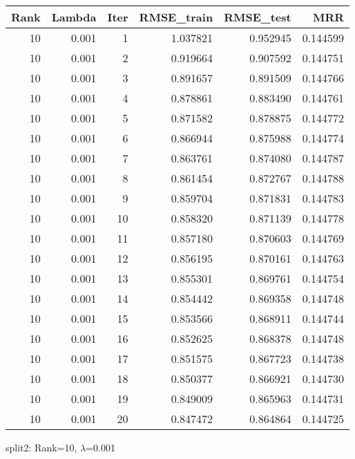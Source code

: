 \begin{tabular}{rrrrrr}
\toprule
 Rank &  Lambda &  Iter &  RMSE\_train &  RMSE\_test &       MRR \\
\midrule
   10 &   0.001 &     1 &    1.037821 &   0.952945 &  0.144599 \\
   10 &   0.001 &     2 &    0.919664 &   0.907592 &  0.144751 \\
   10 &   0.001 &     3 &    0.891657 &   0.891509 &  0.144766 \\
   10 &   0.001 &     4 &    0.878861 &   0.883490 &  0.144761 \\
   10 &   0.001 &     5 &    0.871582 &   0.878875 &  0.144772 \\
   10 &   0.001 &     6 &    0.866944 &   0.875988 &  0.144774 \\
   10 &   0.001 &     7 &    0.863761 &   0.874080 &  0.144787 \\
   10 &   0.001 &     8 &    0.861454 &   0.872767 &  0.144788 \\
   10 &   0.001 &     9 &    0.859704 &   0.871831 &  0.144783 \\
   10 &   0.001 &    10 &    0.858320 &   0.871139 &  0.144778 \\
   10 &   0.001 &    11 &    0.857180 &   0.870603 &  0.144769 \\
   10 &   0.001 &    12 &    0.856195 &   0.870161 &  0.144763 \\
   10 &   0.001 &    13 &    0.855301 &   0.869761 &  0.144754 \\
   10 &   0.001 &    14 &    0.854442 &   0.869358 &  0.144748 \\
   10 &   0.001 &    15 &    0.853566 &   0.868911 &  0.144744 \\
   10 &   0.001 &    16 &    0.852625 &   0.868378 &  0.144748 \\
   10 &   0.001 &    17 &    0.851575 &   0.867723 &  0.144738 \\
   10 &   0.001 &    18 &    0.850377 &   0.866921 &  0.144730 \\
   10 &   0.001 &    19 &    0.849009 &   0.865963 &  0.144731 \\
   10 &   0.001 &    20 &    0.847472 &   0.864864 &  0.144725 \\
\bottomrule
\end{tabular}

\caption{split2: Rank=10, $\lambda$=0.001}
